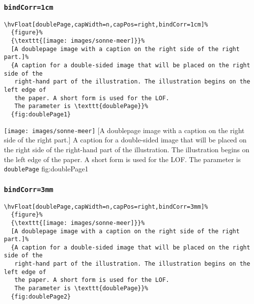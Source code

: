 \documentclass[twoside,twocolumn]{scrartcl}
\makeatletter
\let\hvBlindtext\Blindtext
\def\Blindtext{\par\color{black!40}\hvBlindtext\par\normalcolor}
\def\hvblindtext{\textcolor{black!40}{\blindtext@text}}
\makeatother
\begin{document}
\hvblindtext

\subsubsection{\texttt{bindCorr=1cm}}

\begin{lstlisting}
\hvFloat[doublePage,capWidth=n,capPos=right,bindCorr=1cm]%
  {figure}%
  {\texttt{[image: images/sonne-meer]}}%
  [A doublepage image with a caption on the right side of the right part.]%
  {A caption for a double-sided image that will be placed on the right side of the
   right-hand part of the illustration. The illustration begins on the left edge of 
   the paper. A short form is used for the LOF. 
   The parameter is \texttt{doublePage}}%
  {fig:doublePage1}
\end{lstlisting}

%
  {\texttt{[image: images/sonne-meer]}}%
  [A doublepage image with a caption on the right side of the right part.]%
  {A caption for a double-sided image that will be placed on the right side of the
   right-hand part of the illustration. The illustration begins on the left edge of 
   the paper. A short form is used for the LOF. 
   The parameter is \texttt{doublePage}}%
  {fig:doublePage1}

\hvblindtext

\Blindtext

\Blindtext

\Blindtext

\hvblindtext

\subsubsection{\texttt{bindCorr=3mm}}
\begin{lstlisting}
\hvFloat[doublePage,capWidth=n,capPos=right,bindCorr=3mm]%
  {figure}%
  {\texttt{[image: images/sonne-meer]}}%
  [A doublepage image with a caption on the right side of the right part.]%
  {A caption for a double-sided image that will be placed on the right side of the
   right-hand part of the illustration. The illustration begins on the left edge of 
   the paper. A short form is used for the LOF. 
   The parameter is \texttt{doublePage}}%
  {fig:doublePage2}
\end{lstlisting}
\end{document}

